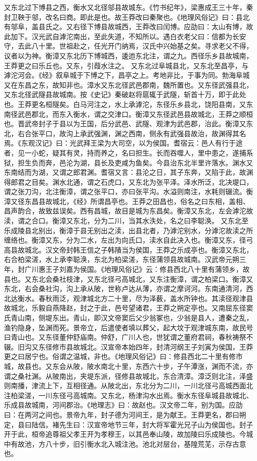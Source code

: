 \documentclass[12pt,UTF8]{ctexbook}
\begin{document}
又东北过下博县之西，衡水又北径邬县故城东。《竹书纪年》，梁惠成王三十年，秦封卫鞅于邬，改名曰商。即此是也。故王莽改曰秦聚也。《地理风俗记》曰：县北有邬阜，盖县氏之。又右径下博县故城西，王莽改曰闰博。应劭曰：太山有博，故此加下。汉光武自滹沱南出，至此失道，不知所以。遇白衣老父曰：信都为长安守，去此八十里。世祖赴之，任光开门纳焉，汉氏中兴始基之矣。寻求老父不得，议者以为神。衡漳又东北历下博城西，逶迆东北注，谓之九。西径乐乡县故城南，王莽更之曰乐丘也。又东，引葭水注之。
又东北过阜城县北，又东北至昌亭，与滹沱河会。《经》叙阜城于下博之下，昌亭之上。考地非比，于事为同。勃海阜城又在东昌之东，故知非也。漳水又东北径武邑郡南，魏所置也。又东径武强县北，又东北径武隧县故城南。按《史记》秦破赵将扈辄于武隧，斩首十万，即于此处也。王莽更名桓隧矣。白马河注之，水上承滹沱，东径乐乡县北，饶阳县南，又东南径武邑郡北，而东入衡水，谓之交津口。衡漳又东径武邑县故城北，王莽之顺桓也。晋武帝封子于县以为王国，后分武邑、武隧、观津为武邑郡，治此。衡漳又东北，右合张平口，故沟上承武强渊，渊之西南，侧永有武强县故治，故渊得其名焉。《东观汉记》曰：光武拜王梁为大司空，以为侯国。耆宿云：邑人有行于途者，见一小蛇，疑其有灵，持而养之，名曰担生。长而吞噬人，里中患之，遂捕系狱，担生负而奔，邑沦为湖，县长及吏咸为鱼矣。今县治东北半里许落水。渊水又东南结而为湖，又谓之郎君渊。耆宿又言：县沦之日，其子东奔，又陷于此，故渊得郎君之目矣。渊水北通，谓之石虎口，又东北为张平泽。泽水所泛，北决堤口，谓之张刀沟，北注衡漳，谓之张平口，亦曰张平沟。水溢则南注，水耗则辍流。衡漳又径东昌县故城北，《经》所谓昌亭也。王莽之田昌也，俗名之曰东相，盖相、昌声韵合，故致兹误矣。西有昌城，故目是城为东昌矣。衡漳又东北，左会滹沱故渎，谓之合口。衡漳又东北，分为二川，当其水泆处，名之曰李聪涣。
又东北至乐成陵县北别出，衡漳于县无别出之渎，出县北者，乃滹沱别水，分滹沱故渎之所缠络也。衡漳又东，分为二水，左出为向氏口，渎水自此决入也。衡漳又东，径弓高县故城北。汉文帝封韩王信之子韩隤当为侯国，王莽之乐成亭也。衡漳又东北，右合柏梁溠，水上承李聪涣，东北为柏梁溠，东径蒲领县故城南。汉武帝元朔三年，封广川惠王子刘嘉为侯国。《地理风俗记》云：修县西北八十里有蒲领乡，故县也。又东北会桑社枝津，又东北径弓高城北，又东注衡漳，谓之柏梁口。衡漳又东北，右会桑社沟，沟上承从陂，世称卢达从薄，亦谓之摩诃河。东南通清河，西北达衡水。春秋雨泛，观津城北方二十里，尽为泽薮，盖水所钟也。其渎径观津县故城北，乐毅自燕降赵，封之于此，邑号望诸君，王莽之朔定亭也。又南屈东径窦氏青山南，侧堤东出。青山，即汉文帝窦后父少翁冢也，少翁是县人，遭秦之乱，渔钓隐身，坠渊而死。景帝立，后遣使者填以葬父，起大坟于观津城东南，故民号曰青山也。又东径董仲舒庙南。仲舒，广川人也，世犹谓之董府君祠，春秋祷祭不辍。旧沟又东径修市县故城北。汉宣帝本始四年，封清河纲王子刘寅为侯国，王莽更之曰居宁也。俗谓之温城，非也。《地理风俗记》曰：修县西北二十里有修市城，故县也。又东会从陂，陂水南北十里，东西六十步，子午潭涨，渊而不流，亦谓之桑社渊。从陂南出，夹堤东派，径修县故城北，东合清漳。漳泛则北注，泽盛则南播，津流上下，互相径通。从陂北出，东北分为二川，一川北径弓高城西面北注柏梁溠，一川东径弓高城南。又东北，杨津沟水出焉。衡水东径阜城县故城北、乐成县故城南，河间郡治。《地理志》曰：故赵也。汉文帝二年，别为国。应劭曰：在两河之间也。景帝九年，封子德为河间王，是为献王。王莽更名，郡曰朔定，县曰陆信。褚先生曰：汉宣帝地节三年，封大将军霍光兄子山为侯国也。封子开于此，桓帝追尊祖父孝王开为孝穆王，以其邑奉山陵，故加陵曰乐成陵也。今城中有故池，方八十步，旧引衡水北入城注池。池北对层台，基隍荒芜，示存古意也。
\end{document}
